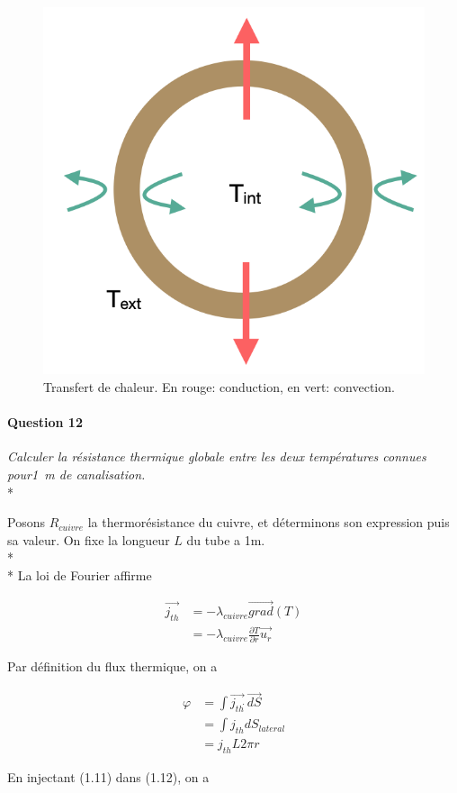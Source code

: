 \documentclass[oneside,a4paper,13pt]{book}
\begin{document}
\begin{figure}[h!]
\centering
  \includegraphics[width=0.5\linewidth]{q11.png}
  \caption{Transfert de chaleur. En rouge: conduction, en vert: convection.}
  \label{fig:q11}
\end{figure}

\paragraph{Question 12} 
\textit{ Calculer la résistance thermique globale entre les deux températures connues pour\SI{1}{ \meter} de canalisation.} \\* 

Posons $R_{cuivre}$ la thermorésistance du cuivre, et déterminons son expression puis sa valeur. On fixe la longueur $L$ du tube a 1m.\\* \\*
La loi de Fourier affirme

\begin{equation} \label{eq11}
\begin{split}
	\vec{j_{th}} & =  -\lambda_{cuivre} \vec{grad}(T) \\
	& = -\lambda_{cuivre} \frac{\partial T}{\partial r} \vec{u_{r}}
\end{split}
\end{equation}

Par définition du flux thermique, on a

\begin{equation} \label{eq11}
\begin{split}
	\varphi & =  \int \vec{j_{th}}\dot\ \vec{dS} \\
	& = \int j_{th} dS_{lateral}\\
	& = j_{th} L2\pi r
\end{split}
\end{equation}

En injectant (1.11) dans (1.12), on a
\end{document}
